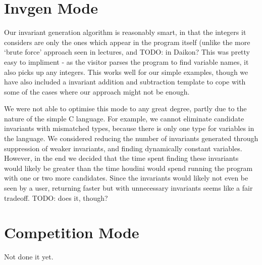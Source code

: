 \documentclass[11pt]{article}
\begin{document}
\section{Invgen Mode}

Our invariant generation algorithm is reasonably smart, in that the integers it considers are only the ones which appear in the program itself (unlike the more `brute force' approach seen in lectures, and TODO: in Daikon? This was pretty easy to impliment - as the visitor parses the program to find variable names, it also picks up any integers. This works well for our simple examples, though we have also included a invariant addition and subtraction template to cope with some of the cases where our approach might not be enough.

We were not able to optimise this mode to any great degree, partly due to the nature of the simple C language. For example, we cannot eliminate candidate invariants with mismatched types, because there is only one type for variables in the language. We considered reducing the number of invariants generated through suppression of weaker invariants, and finding dynamically constant variables. However, in the end we decided that the time spent finding these invariants would likely be greater than the time houdini would spend running the program with one or two more candidates. Since the invariants would likely not even be seen by a user, returning faster but with unnecessary invariants seems like a fair tradeoff. TODO: does it, though?

\section{Competition Mode}

Not done it yet.
\end{document}
